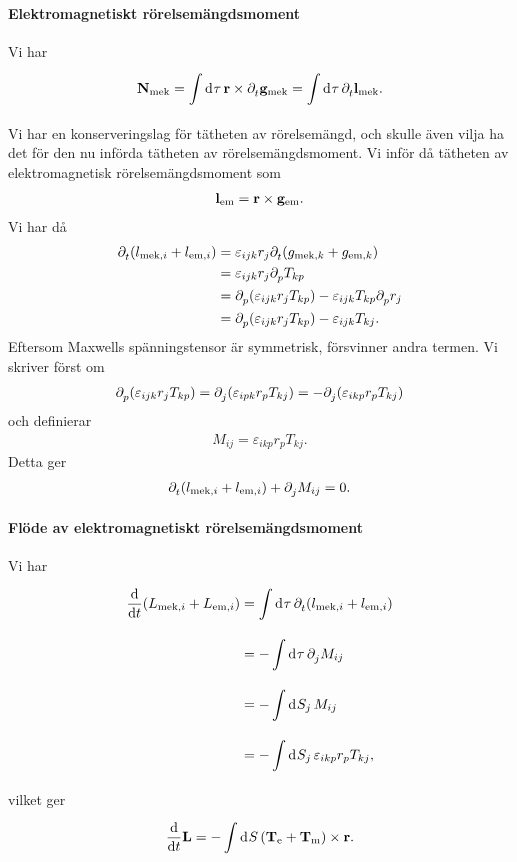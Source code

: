 \paragraph{Elektromagnetiskt rörelsemängdsmoment}
Vi har
\begin{align*}
	\vb{N}_{\text{mek}} = \int\limits_{}^{}\dd[]{\tau}\vb{r}\times\partial_{t}^{}\vb{g}_{\text{mek}} = \int\limits_{}^{}\dd[]{\tau}\partial_{t}^{}\vb{l}_{\text{mek}}.
\end{align*}
Vi har en konserveringslag för tätheten av rörelsemängd, och skulle även vilja ha det för den nu införda tätheten av rörelsemängdsmoment. Vi inför då tätheten av elektromagnetisk rörelsemängdsmoment som
\begin{align*}
	\vb{l}_{\text{em}} = \vb{r}\times\vb{g}_{\text{em}}.
\end{align*}
Vi har då
\begin{align*}
	\partial_{t}^{}(l_{\text{mek}, i} + l_{\text{em}, i}) &= \varepsilon_{ijk}r_{j}\partial_{t}^{}(g_{\text{mek}, k} + g_{\text{em}, k}) \\
	                                                &= \varepsilon_{ijk}r_{j}\partial_{p}^{}T_{kp} \\
	                                                &= \partial_{p}^{}(\varepsilon_{ijk}r_{j}T_{kp}) - \varepsilon_{ijk}T_{kp}\partial_{p}^{}r_{j} \\
	                                                &= \partial_{p}^{}(\varepsilon_{ijk}r_{j}T_{kp}) - \varepsilon_{ijk}T_{kj}.
\end{align*}
Eftersom Maxwells spänningstensor är symmetrisk, försvinner andra termen. Vi skriver först om
\begin{align*}
	\partial_{p}^{}(\varepsilon_{ijk}r_{j}T_{kp}) = \partial_{j}^{}(\varepsilon_{ipk}r_{p}T_{kj}) = -\partial_{j}^{}(\varepsilon_{ikp}r_{p}T_{kj})
\end{align*}
och definierar
\begin{align*}
	M_{ij} = \varepsilon_{ikp}r_{p}T_{kj}.
\end{align*}
Detta ger
\begin{align*}
	\partial_{t}^{}(l_{\text{mek}, i} + l_{\text{em}, i}) + \partial_{j}^{}M_{ij} = 0.
\end{align*}

\paragraph{Flöde av elektromagnetiskt rörelsemängdsmoment}
Vi har
\begin{align*}
	\dv{t}(L_{\text{mek}, i} + L_{\text{em}, i}) &= \int\limits_{}^{}\dd[]{\tau}\partial_{t}^{}(l_{\text{mek}, i} + l_{\text{em}, i}) \\
	                                             &= -\int\limits_{}^{}\dd[]{\tau}\partial_{j}^{}M_{ij} \\
	                                             &= -\int\limits_{}^{}\dd[]{S_{j}}M_{ij} \\
	                                             &= -\int\limits_{}^{}\dd[]{S_{j}}\varepsilon_{ikp}r_{p}T_{kj},
\end{align*}
vilket ger
\begin{align*}
	\dv{t}\vb{L} = -\int\limits_{}^{}\dd[]{S}(\vb{T}_{\text{e}} + \vb{T}_{\text{m}})\times\vb{r}.
\end{align*}